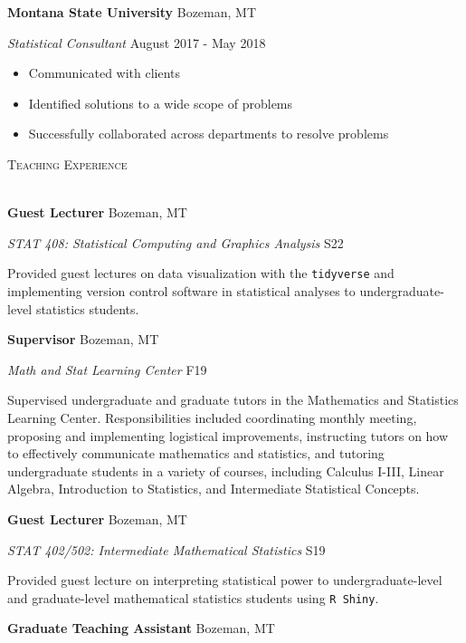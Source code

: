 \documentclass[a4paper]{article}
\newcommand{\lineunder} {
	\vspace*{-8pt} \\
	\hspace*{-18pt} \hrulefill \\
}
\newcommand{\header} [1] {
	{\hspace*{-18pt}\vspace*{6pt} \textcolor{Cerulean}{\textsc{#1}}}
	\vspace*{-6pt} \textcolor{Cerulean}{\lineunder}
}
\begin{document}
\textbf{Montana State University} \hfill Bozeman, MT

\textit{Statistical Consultant} \hfill August 2017 - May 2018

\vspace{-1mm}
\begin{itemize} \itemsep 1pt
   \item Communicated with clients
   \item Identified solutions to a wide scope of problems
   \item Successfully collaborated across departments to resolve problems
\end{itemize}

\newpage

\header{Teaching Experience}
\vspace*{2mm}

\textbf{Guest Lecturer} \hfill Bozeman, MT

\emph{STAT 408: Statistical Computing and Graphics Analysis} \hfill S22

Provided guest lectures on data visualization with the
\texttt{tidyverse} and implementing version control software in
statistical analyses to undergraduate-level statistics students.
\vspace*{2mm}

\textbf{Supervisor} \hfill Bozeman, MT

\emph{Math and Stat Learning Center} \hfill F19

Supervised undergraduate and graduate tutors in the Mathematics and
Statistics Learning Center. Responsibilities included coordinating
monthly meeting, proposing and implementing logistical improvements,
instructing tutors on how to effectively communicate mathematics and
statistics, and tutoring undergraduate students in a variety of courses,
including Calculus I-III, Linear Algebra, Introduction to Statistics,
and Intermediate Statistical Concepts.\vspace*{2mm}

\textbf{Guest Lecturer} \hfill Bozeman, MT

\emph{STAT 402/502: Intermediate Mathematical Statistics} \hfill S19

Provided guest lecture on interpreting statistical power to
undergraduate-level and graduate-level mathematical statistics students
using \texttt{R\ Shiny}. \vspace*{2mm}

\textbf{Graduate Teaching Assistant} \hfill Bozeman, MT
\end{document}
